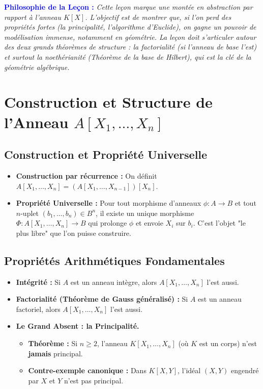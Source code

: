 \documentclass[12pt, a4paper, parskip=full]{report}
\theoremstyle{agregstyle}
\newenvironment{philosophie}
  {\par\medskip\noindent\begin{oframed}\noindent\textbf{\textcolor{blue}{Philosophie de la Leçon :}}\itshape}
  {\end{oframed}\par\medskip}
\begin{document}
\begin{philosophie}
    Cette leçon marque une montée en abstraction par rapport à l'anneau $K[X]$. L'objectif est de montrer que, si l'on perd des propriétés fortes (la principalité, l'algorithme d'Euclide), on gagne un pouvoir de modélisation immense, notamment en géométrie. La leçon doit s'articuler autour des deux grands théorèmes de structure : la factorialité (si l'anneau de base l'est) et surtout la noethérianité (Théorème de la base de Hilbert), qui est la clé de la géométrie algébrique.
\end{philosophie}

\section{Construction et Structure de l'Anneau $A[X_1, \dots, X_n]$}

\subsection{Construction et Propriété Universelle}
\begin{itemize}
    \item \textbf{Construction par récurrence :} On définit $A[X_1, \dots, X_n] = (A[X_1, \dots, X_{n-1}])[X_n]$.
    \item \textbf{Propriété Universelle :} Pour tout morphisme d'anneaux $\phi: A \to B$ et tout $n$-uplet $(b_1, \dots, b_n) \in B^n$, il existe un unique morphisme $\Phi: A[X_1, \dots, X_n] \to B$ qui prolonge $\phi$ et envoie $X_i$ sur $b_i$. C'est l'objet "le plus libre" que l'on puisse construire.
\end{itemize}

\subsection{Propriétés Arithmétiques Fondamentales}
\begin{itemize}
    \item \textbf{Intégrité :} Si $A$ est un anneau intègre, alors $A[X_1, \dots, X_n]$ l'est aussi.
    \item \textbf{Factorialité (Théorème de Gauss généralisé) :} Si $A$ est un anneau factoriel, alors $A[X_1, \dots, X_n]$ l'est aussi.
    \item \textbf{Le Grand Absent : la Principalité.}
        \begin{itemize}
            \item \textbf{Théorème :} Si $n \ge 2$, l'anneau $K[X_1, \dots, X_n]$ (où $K$ est un corps) n'est \textbf{jamais} principal.
            \item \textbf{Contre-exemple canonique :} Dans $K[X,Y]$, l'idéal $(X,Y)$ engendré par $X$ et $Y$ n'est pas principal.
        \end{itemize}
\end{itemize}
\end{document}
